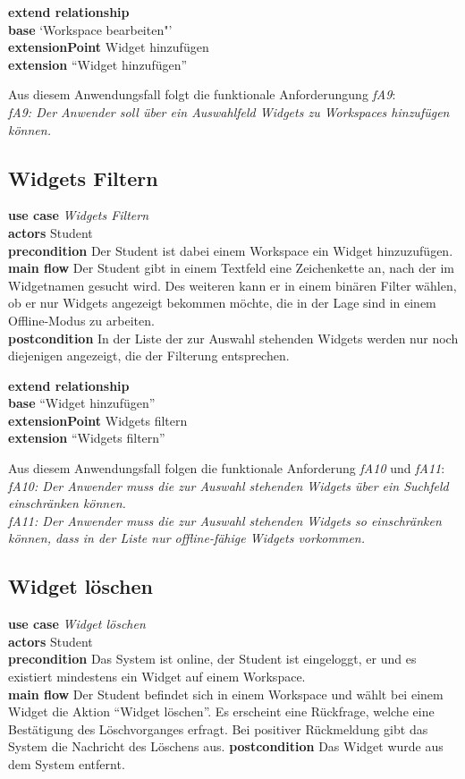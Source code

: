 \textbf{extend relationship}\\
\textbf{base} `Workspace bearbeiten"'\\
\textbf{extensionPoint} Widget hinzufügen\\
\textbf{extension} "`Widget hinzufügen"'

Aus diesem Anwendungsfall folgt die funktionale Anforderungung \emph{fA9}:\\
\emph{fA9: Der Anwender soll über ein Auswahlfeld Widgets zu Workspaces hinzufügen können.}\\ 

\subsection{Widgets Filtern}
\textbf{use case} \emph{Widgets Filtern}\\
\textbf{actors} Student\\
\textbf{precondition} Der Student ist dabei einem Workspace ein Widget hinzuzufügen.\\
\textbf{main flow} Der Student gibt in einem Textfeld eine Zeichenkette an, nach der im Widgetnamen gesucht wird. Des weiteren kann er in einem binären Filter wählen, ob er nur Widgets angezeigt bekommen möchte, die in der Lage sind in einem Offline-Modus zu arbeiten.\\
\textbf{postcondition} In der Liste der zur Auswahl stehenden Widgets werden nur noch diejenigen angezeigt, die der Filterung entsprechen.
 
\textbf{extend relationship}\\
\textbf{base} "`Widget hinzufügen"'\\
\textbf{extensionPoint} Widgets filtern\\
\textbf{extension} "`Widgets filtern"'
 
Aus diesem Anwendungsfall folgen die funktionale Anforderung \emph{fA10} und \emph{fA11}:\\
\emph{fA10: Der Anwender muss die zur Auswahl stehenden Widgets über ein Suchfeld einschränken können.}\\
\emph{fA11: Der Anwender muss die zur Auswahl stehenden Widgets so einschränken können, dass in der Liste nur offline-fähige Widgets vorkommen.}
 
 \subsection{Widget löschen}
\textbf{use case} \emph{Widget löschen}\\
\textbf{actors} Student\\
\textbf{precondition} Das System ist online, der Student ist eingeloggt, er und es existiert mindestens ein Widget auf einem Workspace.\\
\textbf{main flow} Der Student befindet sich in einem Workspace und wählt bei einem Widget die Aktion "`Widget löschen"'. Es erscheint eine Rückfrage, welche eine Bestätigung des Löschvorganges erfragt. Bei positiver Rückmeldung gibt das System die Nachricht des Löschens aus.
\textbf{postcondition} Das Widget wurde aus dem System entfernt.
 
